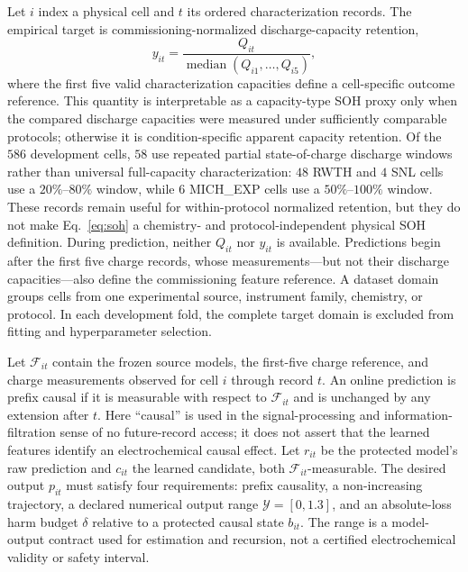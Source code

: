 \documentclass[preprint,12pt]{elsarticle}
\begin{document}
Let $i$ index a physical cell and $t$ its ordered characterization records. The empirical target is commissioning-normalized discharge-capacity retention,
\begin{equation}
  y_{it}=\frac{Q_{it}}{\operatorname{median}(Q_{i1},\ldots,Q_{i5})},
  \label{eq:soh}
\end{equation}
where the first five valid characterization capacities define a cell-specific outcome reference. This quantity is interpretable as a capacity-type SOH proxy only when the compared discharge capacities were measured under sufficiently comparable protocols; otherwise it is condition-specific apparent capacity retention. Of the $586$ development cells, $58$ use repeated partial state-of-charge discharge windows rather than universal full-capacity characterization: $48$ RWTH and $4$ SNL cells use a $20\%$--$80\%$ window, while $6$ MICH\_EXP cells use a $50\%$--$100\%$ window. These records remain useful for within-protocol normalized retention, but they do not make Eq.~\eqref{eq:soh} a chemistry- and protocol-independent physical SOH definition. During prediction, neither $Q_{it}$ nor $y_{it}$ is available. Predictions begin after the first five charge records, whose measurements---but not their discharge capacities---also define the commissioning feature reference. A dataset domain groups cells from one experimental source, instrument family, chemistry, or protocol. In each development fold, the complete target domain is excluded from fitting and hyperparameter selection.

Let $\mathcal F_{it}$ contain the frozen source models, the first-five charge reference, and charge measurements observed for cell $i$ through record $t$. An online prediction is prefix causal if it is measurable with respect to $\mathcal F_{it}$ and is unchanged by any extension after $t$. Here ``causal'' is used in the signal-processing and information-filtration sense of no future-record access; it does not assert that the learned features identify an electrochemical causal effect. Let $r_{it}$ be the protected model's raw prediction and $c_{it}$ the learned candidate, both $\mathcal F_{it}$-measurable. The desired output $p_{it}$ must satisfy four requirements: prefix causality, a non-increasing trajectory, a declared numerical output range $\mathcal Y=[0,1.3]$, and an absolute-loss harm budget $\delta$ relative to a protected causal state $b_{it}$. The range is a model-output contract used for estimation and recursion, not a certified electrochemical validity or safety interval.
\end{document}
